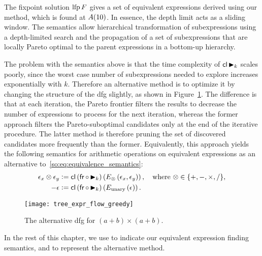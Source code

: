 The fixpoint solution $\operatorname{\mathrm{lfp}} F$ gives a set of equivalent expressions derived
using our method, which is found at $A({10})$. In essence, the depth limit
acts as a sliding window.  The semantics allow hierarchical transformation of
subexpressions using a depth-limited search and the propagation of a set of
subexpressions that are locally Pareto optimal to the parent expressions in a
bottom-up hierarchy.

The problem with the semantics above is that the time complexity of $\operatorname{\mathsf{cl}}
\operatorname{\blacktriangleright}_k$ scales poorly, since the worst case number of subexpressions
needed to explore increases exponentially with $k$. Therefore an alternative
method is to optimize it by changing the structure of the \gls{dfg} slightly,
as shown in Figure~\ref{so:fig:tree_expr_flow_greedy}.  The difference is
that at each iteration, the Pareto frontier filters the results to decrease
the number of expressions to process for the next iteration, whereas the
former approach filters the Pareto-suboptimal candidates only at the end of
the iterative procedure.  The latter method is therefore pruning the set of
discovered candidates more frequently than the former.  Equivalently, this
approach yields the following semantics for arithmetic operations on equivalent
expressions as an alternative to~\eqref{so:eq:equivalence_semantics}:
\begin{equation}
    \begin{aligned}
        \epsilon_x \otimes \epsilon_y &\vcentcolon=
            \operatorname{\mathsf{cl}} \left( \operatorname{\mathsf{fr}} \circ \operatorname{\blacktriangleright}_k \right) \left(
                E_\otimes \left( \epsilon_x, \epsilon_y \right)
            \right), \quad\text{where~} \otimes\in\{ +, -, \times, / \}, \\
        -\epsilon &\vcentcolon=
            \operatorname{\mathsf{cl}} \left( \operatorname{\mathsf{fr}} \circ \operatorname{\blacktriangleright}_k \right) \left(
                E_{\mathrm{unary}} \left( \epsilon \right)
            \right).
    \end{aligned}
    \label{so:eq:equivalence_semantics_alt}
\end{equation}
\begin{figure}[ht]
    \centering
    \texttt{[image: tree\_expr\_flow\_greedy]}
    \caption{%
        The alternative \acrshort{dfg} for $(a + b) \times (a + b)$.
    }\label{so:fig:tree_expr_flow_greedy}
\end{figure}

In the rest of this chapter, we use \frontiertrace{} to indicate our equivalent
expression finding semantics, and \greedytrace{} to represent the alternative
method.

